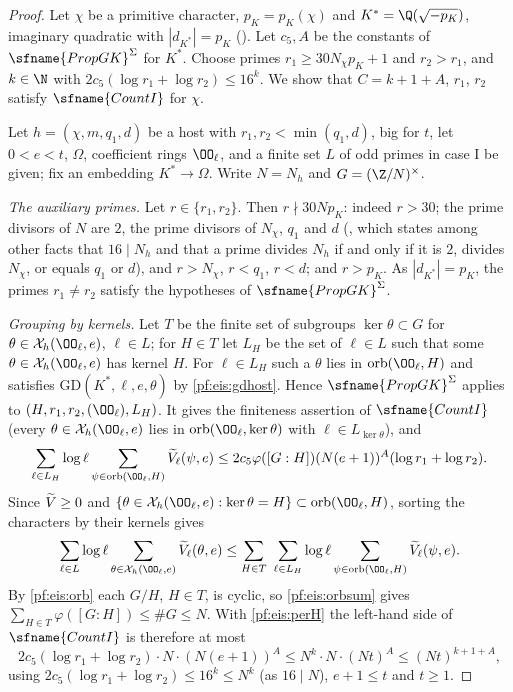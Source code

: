 \begin{proof}
Let $\chi$ be a primitive character, $p_K=p_K(\chi)$ and $K^*=\Q(\sqrt{-p_K})$, imaginary quadratic with $|d_{K^*}|=p_K$
(). Let $c_5,A$ be the constants of $\sfname{PropGK}^{\Sigma}$ for $K^*$. Choose primes
$r_1\ge30N_\chi p_K+1$ and $r_2>r_1$, and $k\in\N$ with $2c_5(\log r_1+\log r_2)\le16^k$. We show that $C=k+1+A$, $r_1$, $r_2$
satisfy $\sfname{CountI}$ for $\chi$.

Let $h=(\chi,m,q_1,d)$ be a host with $r_1,r_2<\min(q_1,d)$, big for $t$, let $0<e<t$, $\Omega$, coefficient rings $\OO_\ell$, and a
finite set $L$ of odd primes in case I be given; fix an embedding $K^*\to\Omega$. Write $N=N_h$ and
$G=(\Z/N)^\times$.

\emph{The auxiliary primes.} Let $r\in\{r_1,r_2\}$. Then $r\nmid30N p_K$: indeed $r>30$; the prime divisors of $N$ are $2$,
the prime divisors of $N_\chi$, $q_1$ and $d$ (, which states among other facts that
$16\mid N_h$ and that a prime divides $N_h$ if and only if it is $2$, divides $N_\chi$, or equals $q_1$ or $d$), and $r>N_\chi$,
$r<q_1$, $r<d$; and $r>p_K$. As $|d_{K^*}|=p_K$, the primes $r_1\ne r_2$ satisfy the hypotheses of $\sfname{PropGK}^{\Sigma}$.

\emph{Grouping by kernels.} Let $T$ be the finite set of subgroups $\ker\theta\subset G$ for $\theta\in\eisX_h(\OO_\ell,e)$,
$\ell\in L$; for $H\in T$ let $L_H$ be the set of $\ell\in L$ such that some $\theta\in\eisX_h(\OO_\ell,e)$ has kernel $H$. For
$\ell\in L_H$ such a $\theta$ lies in $\mathrm{orb}(\OO_\ell,H)$ and satisfies $\mathrm{GD}(K^*,\ell,e,\theta)$ by \cref{pf:eis:gdhost}.
Hence $\sfname{PropGK}^{\Sigma}$ applies to $(H,r_1,r_2,(\OO_\ell),L_H)$. It gives the finiteness assertion of $\sfname{CountI}$ (every
$\theta\in\eisX_h(\OO_\ell,e)$ lies in $\mathrm{orb}(\OO_\ell,\ker\theta)$ with $\ell\in L_{\ker\theta}$), and
\begin{equation}\label{pf:eis:perH}
 \sum_{\ell\in L_H}\log\ell\sum_{\psi\in\mathrm{orb}(\OO_\ell,H)}\eisVt_\ell(\psi,e)\le2c_5\varphi([G:H])(N(e+1))^A(\log r_1+\log r_2).
\end{equation}
Since $\widetilde V\ge0$ and $\{\theta\in\eisX_h(\OO_\ell,e):\ker\theta=H\}\subset\mathrm{orb}(\OO_\ell,H)$, sorting the characters by their kernels gives
\[
 \sum_{\ell\in L}\log\ell\sum_{\theta\in\eisX_h(\OO_\ell,e)}\eisVt_\ell(\theta,e)\le\sum_{H\in T}\ \sum_{\ell\in L_H}\log\ell
 \sum_{\psi\in\mathrm{orb}(\OO_\ell,H)}\eisVt_\ell(\psi,e).
\]
By \cref{pf:eis:orb} each $G/H$, $H\in T$, is cyclic, so \cref{pf:eis:orbsum} gives $\sum_{H\in T}\varphi([G:H])\le\#G\le N$.
With \eqref{pf:eis:perH} the left-hand side of $\sfname{CountI}$ is therefore at most
\[
 2c_5(\log r_1+\log r_2)\cdot N\cdot(N(e+1))^A\le N^k\cdot N\cdot(Nt)^A\le(Nt)^{k+1+A},
\]
using $2c_5(\log r_1+\log r_2)\le16^k\le N^k$ (as $16\mid N$), $e+1\le t$ and $t\ge1$.
\end{proof}

